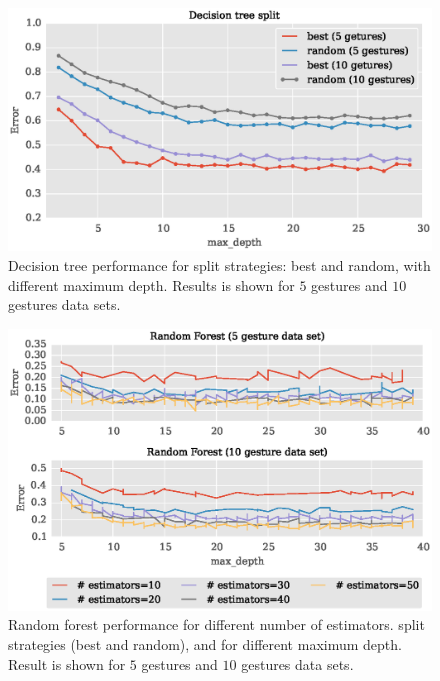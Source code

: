 \documentclass{article}
\begin{document}
\begin{figure}[t]
\vskip 0.2in
\begin{center}
\centerline{\includegraphics[width=\columnwidth]{DT_max_depth_split.eps}}
\caption{Decision tree performance for split strategies: best and random, with different maximum depth. Results is shown for $5$ gestures and $10$ gestures data sets.}
\label{fig:DT_dept_split}
\end{center}
\vskip -0.2in
\end{figure}

\begin{figure}[t]
\vskip 0.2in
\begin{center}
\centerline{\includegraphics[width=\columnwidth]{randomForest_estimators.eps}}
\caption{Random forest performance for different number of estimators. split strategies (best and random), and for different maximum depth. Result is shown for $5$ gestures and $10$ gestures data sets.}
\label{fig:randomForest_estimators}
\end{center}
\vskip -0.2in
\end{figure}
\end{document}
